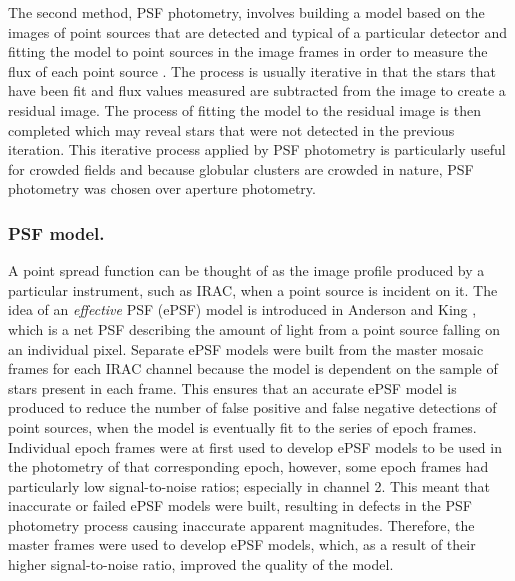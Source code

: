 \documentclass[11pt]{iopart}
\begin{document}
The second method, PSF photometry, involves building a model based on the images of point sources that are detected and typical of a particular detector and fitting the model to point sources in the image frames in order to measure the flux of each point source \cite{ccdastron}. The process is usually iterative in that the stars that have been fit and flux values measured are subtracted from the image to create a residual image. The process of fitting the model to the residual image is then completed which may reveal stars that were not detected in the previous iteration. This iterative process applied by PSF photometry is particularly useful for crowded fields and because globular clusters are crowded in nature, PSF photometry was chosen over aperture photometry.

\subsubsection{PSF model.}
A point spread function can be thought of as the image profile produced by a particular instrument, such as IRAC, when a point source is incident on it. The idea of an \textit{effective} PSF (ePSF) model is introduced in Anderson and King \cite{andersonking2000}, which is a net PSF describing the amount of light from a point source falling on an individual pixel. Separate ePSF models were built from the master mosaic frames for each IRAC channel because the model is dependent on the sample of stars present in each frame. This ensures that an accurate ePSF model is produced to reduce the number of false positive and false negative detections of point sources, when the model is eventually fit to the series of epoch frames. Individual epoch frames were at first used to develop ePSF models to be used in the photometry of that corresponding epoch, however, some epoch frames had particularly low signal-to-noise ratios; especially in channel 2. This meant that inaccurate or failed ePSF models were built, resulting in defects in the PSF photometry process causing inaccurate apparent magnitudes. Therefore, the master frames were used to develop ePSF models, which, as a result of their higher signal-to-noise ratio, improved the quality of the model.
\end{document}
